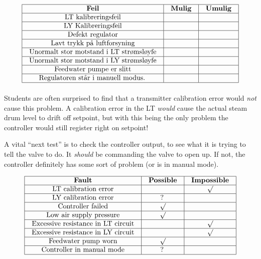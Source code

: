 
$$\vbox{\offinterlineskip
\halign{\strut
\vrule \quad\hfil # \ \hfil & 
\vrule \quad\hfil # \ \hfil & 
\vrule \quad\hfil # \ \hfil \vrule \cr
\noalign{\hrule}
%
{\bf Feil} & {\bf Mulig} & {\bf Umulig} \cr
%
\noalign{\hrule}
%
LT kalibreringsfeil &  &  \cr
%
\noalign{\hrule}
%
LY Kalibreringsfeil &  &  \cr
%
\noalign{\hrule}
%
Defekt regulator &  &  \cr
%
\noalign{\hrule}
%
Lavt trykk på luftforsyning &  &  \cr
%
\noalign{\hrule}
%
Unormalt stor motstand i LT strømsløyfe &  &  \cr
%
\noalign{\hrule}
%
Unormalt stor motstand i LY strømsløyfe &  &  \cr
%
\noalign{\hrule}
%
Feedwater pumpe er slitt &  &  \cr
%
\noalign{\hrule}
%
Regulatoren står i manuell modus. &  &  \cr
%
\noalign{\hrule}
} %
}$$ %







Students are often surprised to find that a transmitter calibration error would {\it not} cause this problem.  A calibration error in the LT {\it would} cause the actual steam drum level to drift off setpoint, but with this being the only problem the controller would still register right on setpoint!

\vskip 10pt

A vital ``next test'' is to check the controller output, to see what it is trying to tell the valve to do.  It {\it should} be commanding the valve to open up.  If not, the controller definitely has some sort of problem (or is in manual mode).








$$\vbox{\offinterlineskip
\halign{\strut
\vrule \quad\hfil # \ \hfil & 
\vrule \quad\hfil # \ \hfil & 
\vrule \quad\hfil # \ \hfil \vrule \cr
\noalign{\hrule}
%
{\bf Fault} & {\bf Possible} & {\bf Impossible} \cr
%
\noalign{\hrule}
%
LT calibration error &  & $\surd$ \cr
%
\noalign{\hrule}
%
LY calibration error & ? &  \cr
%
\noalign{\hrule}
%
Controller failed & $\surd$ &  \cr
%
\noalign{\hrule}
%
Low air supply pressure & $\surd$ &  \cr
%
\noalign{\hrule}
%
Excessive resistance in LT circuit &  & $\surd$ \cr
%
\noalign{\hrule}
%
Excessive resistance in LY circuit &  & $\surd$ \cr
%
\noalign{\hrule}
%
Feedwater pump worn & $\surd$ &  \cr
%
\noalign{\hrule}
%
Controller in manual mode & ? &  \cr
%
\noalign{\hrule}
} %
}$$ %

